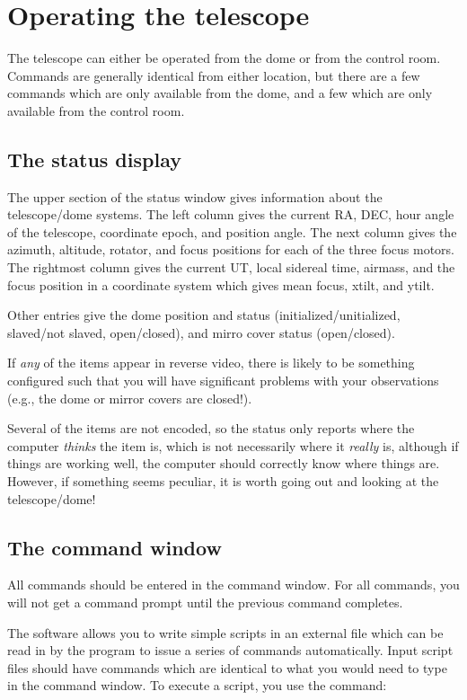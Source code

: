 \documentclass[10pt]{report}
\renewcommand{\[}{\begin{eqnarray}}
\renewcommand{\]}{\end{eqnarray}}
\begin{document}
\chapter{Operating the telescope}

The telescope can either be operated from the dome or from the control room.
Commands are generally identical from either location, but there are a few
commands which are only available from the dome, and a few which are only
available from the control room.

\section{The status display}

The upper section of the status window gives information about the 
telescope/dome systems. The left column gives the current RA, DEC, 
hour angle of the telescope, coordinate epoch, and position angle.
The next column gives the azimuth, altitude, rotator, and focus positions
for each of the three focus motors. The rightmost column gives the
current UT, local sidereal time, airmass, and the focus position in
a coordinate system which gives mean focus, xtilt, and ytilt.

Other entries give the dome position and status (initialized/unitialized,
slaved/not slaved, open/closed), and mirro cover status (open/closed).

If {\it any} of the items appear in reverse video, there is likely to be
something configured such that you will have significant problems with
your observations (e.g., the dome or mirror covers are closed!).

Several of the items are not encoded, so the status only reports where
the computer {\it thinks} the  item is, which is not necessarily where it
{\it really} is, although if things are working well, the computer should
correctly know where things are.
However, if something seems peculiar, it is worth going out and looking
at the telescope/dome!

\section{The command window}

All commands should be entered in the command window. For all commands, 
you will not get a command prompt until the previous command completes.

The software allows you to write simple scripts in an external file which
can be read in by the program to issue a series of commands automatically.
Input script files should have commands which are identical to what you
would need to type in the command window. To execute a script, you use
the  command:
\end{document}
